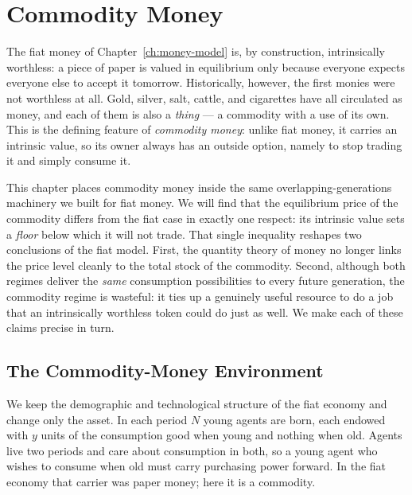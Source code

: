 \chapter{Commodity Money}
\label{ch:commodity}

The fiat money of Chapter~\ref{ch:money-model} is, by construction, intrinsically worthless: a piece of paper is valued in equilibrium only because everyone expects everyone else to accept it tomorrow. Historically, however, the first monies were not worthless at all. Gold, silver, salt, cattle, and cigarettes have all circulated as money, and each of them is also a \emph{thing} --- a commodity with a use of its own. This is the defining feature of \emph{commodity money}: unlike fiat money, it carries an intrinsic value, so its owner always has an outside option, namely to stop trading it and simply consume it.

This chapter places commodity money inside the same overlapping-generations machinery we built for fiat money. We will find that the equilibrium price of the commodity differs from the fiat case in exactly one respect: its intrinsic value sets a \emph{floor} below which it will not trade. That single inequality reshapes two conclusions of the fiat model. First, the quantity theory of money no longer links the price level cleanly to the total stock of the commodity. Second, although both regimes deliver the \emph{same} consumption possibilities to every future generation, the commodity regime is wasteful: it ties up a genuinely useful resource to do a job that an intrinsically worthless token could do just as well. We make each of these claims precise in turn.

\section{The Commodity-Money Environment}

We keep the demographic and technological structure of the fiat economy and change only the asset. In each period $N$ young agents are born, each endowed with $y$ units of the consumption good when young and nothing when old. Agents live two periods and care about consumption in both, so a young agent who wishes to consume when old must carry purchasing power forward. In the fiat economy that carrier was paper money; here it is a commodity.


